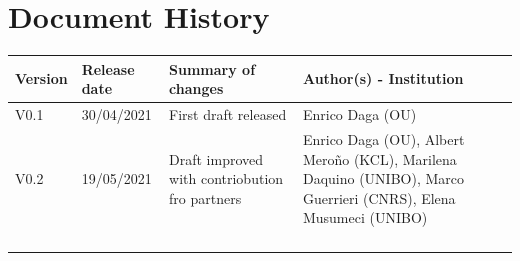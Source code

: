 \section*{Document History}

\begin{tabular}{|l|l|p{9.5cm}|l|}\hline
  \textbf{Version} & \textbf{Release date} & \textbf{Summary of changes} & \textbf{Author(s) - Institution}\\\hline  
  V0.1 & 30/04/2021 & First draft released & Enrico Daga (OU)\\\hline  
  V0.2 & 19/05/2021 & Draft improved with contriobution fro partners & Enrico Daga (OU), Albert Mero\~no (KCL), Marilena Daquino (UNIBO), Marco Guerrieri (CNRS), Elena Musumeci (UNIBO) \\\hline  
  & & & \\\hline  
  & & & \\\hline  
  & & & \\\hline  
  & & & \\\hline  
  \end{tabular}

  \clearpage




